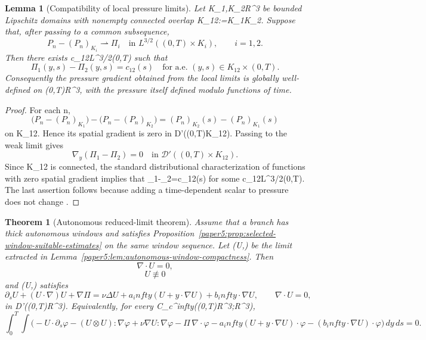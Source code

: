 \documentclass[11pt]{amsart}
\def\({}%
\def\){}%
\def\mathbb#1{#1}%
\def\infty{infty}%
\theoremstyle{plain}
\newtheorem{theorem}{Theorem}[section]
\newtheorem{lemma}[lemma]{Lemma}
\theoremstyle{definition}
\theoremstyle{remark}
\begin{document}
\begin{lemma}[Compatibility of local pressure limits]\label{paper5:lem:pressure-compatibility}
Let \(K_1,K_2\Subset\mathbb R^3\) be bounded Lipschitz domains with
nonempty connected overlap \(K_{12}:=K_1\cap K_2\).  Suppose that, after passing to a common
subsequence,
\[
  P_n-(P_n)_{K_i}\rightharpoonup \Pi_i
  \quad\text{in }L^{3/2}((0,T)\times K_i),
  \qquad i=1,2.
\]
Then there exists \(c_{12}\in L^{3/2}(0,T)\) such that
\[
  \Pi_1(y,s)-\Pi_2(y,s)=c_{12}(s)
  \quad\text{for a.e. }(y,s)\in K_{12}\times(0,T).
\]
Consequently the pressure gradient \(\nabla\Pi\) obtained from the local limits is globally
well-defined on \((0,T)\times\mathbb R^3\), with the pressure itself defined modulo functions
of time.
\end{lemma}

\begin{proof}
For each \(n\),
\[
  \bigl(P_n-(P_n)_{K_1}\bigr)-\bigl(P_n-(P_n)_{K_2}\bigr)
  =(P_n)_{K_2}(s)-(P_n)_{K_1}(s)
\]
on \(K_{12}\).  Hence its spatial gradient is zero in
\(\mathcal D'((0,T)\times K_{12})\).  Passing to the weak limit gives
\[
  \nabla_y(\Pi_1-\Pi_2)=0
  \quad\text{in }\mathcal D'((0,T)\times K_{12}).
\]
Since \(K_{12}\) is connected, the standard distributional characterization of functions with
zero spatial gradient implies that \(\Pi_1-\Pi_2=c_{12}(s)\) for some
\(c_{12}\in L^{3/2}(0,T)\).  The last assertion follows because adding a time-dependent scalar
to pressure does not change \(\nabla\Pi\).
\end{proof}

\begin{theorem}[Autonomous reduced-limit theorem]\label{paper5:thm:autonomous-limit}
Assume that a branch has thick autonomous windows and satisfies
Proposition~\ref{paper5:prop:selected-window-suitable-estimates} on the same window sequence.  Let
\((U,\Pi)\) be the limit extracted in Lemma~\ref{paper5:lem:autonomous-window-compactness}.  Then
\[
  \nabla\cdot U=0,
\]
\[
  U\not\equiv0
\]
and \((U,\Pi)\) satisfies
\begin{equation}\label{paper5:eq:autonomous-limit}
  \partial_sU+(U\cdot\nabla)U+\nabla\Pi
  =\nu\Delta U+a_\infty(U+y\cdot\nabla U)+b_\infty\cdot\nabla U,
  \qquad
  \nabla\cdot U=0,
\end{equation}
in \(\mathcal D'((0,T)\times\mathbb R^3)\).  Equivalently, for every
\(\varphi\in C_c^\infty((0,T)\times\mathbb R^3;\mathbb R^3)\),
\[
  \int_0^T\!\int
  \bigl(
  -U\cdot\partial_s\varphi
  -(U\otimes U):\nabla\varphi
  +\nu\nabla U:\nabla\varphi
  -\Pi\,\nabla\cdot\varphi
  -a_\infty(U+y\cdot\nabla U)\cdot\varphi
  -(b_\infty\cdot\nabla U)\cdot\varphi
  \bigr)\,dy\,ds=0.
\]
\end{theorem}
\end{document}
